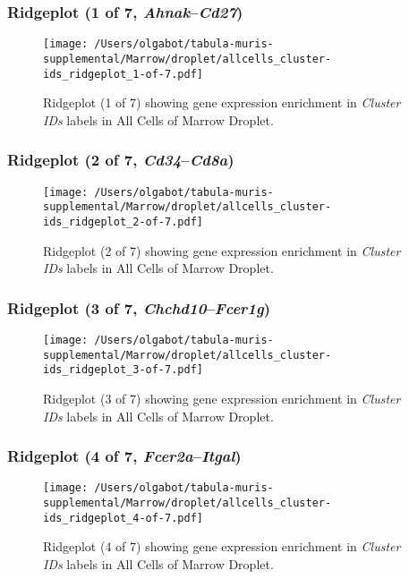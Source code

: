 \clearpage

\subsubsection{Ridgeplot (1 of 7, \emph{Ahnak}--\emph{Cd27})}
\begin{figure}[h]
\centering
\texttt{[image: /Users/olgabot/tabula-muris-supplemental/Marrow/droplet/allcells\_cluster-ids\_ridgeplot\_1-of-7.pdf]}

\caption{ Ridgeplot (1 of 7)  showing gene expression enrichment in \emph{Cluster IDs} labels in All Cells of Marrow Droplet. }
\end{figure}


\clearpage

\subsubsection{Ridgeplot (2 of 7, \emph{Cd34}--\emph{Cd8a})}
\begin{figure}[h]
\centering
\texttt{[image: /Users/olgabot/tabula-muris-supplemental/Marrow/droplet/allcells\_cluster-ids\_ridgeplot\_2-of-7.pdf]}

\caption{ Ridgeplot (2 of 7)  showing gene expression enrichment in \emph{Cluster IDs} labels in All Cells of Marrow Droplet. }
\end{figure}


\clearpage

\subsubsection{Ridgeplot (3 of 7, \emph{Chchd10}--\emph{Fcer1g})}
\begin{figure}[h]
\centering
\texttt{[image: /Users/olgabot/tabula-muris-supplemental/Marrow/droplet/allcells\_cluster-ids\_ridgeplot\_3-of-7.pdf]}

\caption{ Ridgeplot (3 of 7)  showing gene expression enrichment in \emph{Cluster IDs} labels in All Cells of Marrow Droplet. }
\end{figure}


\clearpage

\subsubsection{Ridgeplot (4 of 7, \emph{Fcer2a}--\emph{Itgal})}
\begin{figure}[h]
\centering
\texttt{[image: /Users/olgabot/tabula-muris-supplemental/Marrow/droplet/allcells\_cluster-ids\_ridgeplot\_4-of-7.pdf]}

\caption{ Ridgeplot (4 of 7)  showing gene expression enrichment in \emph{Cluster IDs} labels in All Cells of Marrow Droplet. }
\end{figure}


